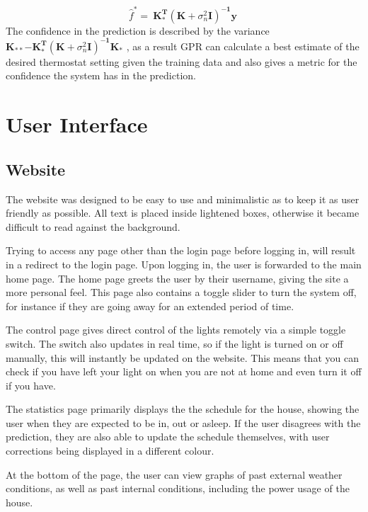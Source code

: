 \documentclass[10.5pt,a4paper,twoside]{report}   %
\begin{document}
\begin{equation}
{\hat{f}}^*=\ {\boldsymbol{K}}^{\boldsymbol{T}}_{\boldsymbol{*}}{\left(\boldsymbol{K}+{\sigma }^2_n\boldsymbol{I}\right)}^{\boldsymbol{-}\boldsymbol{1}}\boldsymbol{y}\ 
\end{equation}
The confidence in the prediction is described by the variance ${\boldsymbol{K}}_{\boldsymbol{\ast\ast}}\boldsymbol{-}{\boldsymbol{K}}^{\boldsymbol{T}}_{\boldsymbol{\ast}}{\left(\boldsymbol{K}+{\sigma }^2_n\boldsymbol{I}\right)}^{\boldsymbol{-}\boldsymbol{1}}{\boldsymbol{K}}_{\boldsymbol{\ast}}$ , as a result GPR can calculate a best estimate of the desired thermostat setting given the training data and also gives a metric for the confidence the system has in the prediction.     

\section{User Interface}
\subsection{Website}
The website was designed to be easy to use and minimalistic as to keep it as user friendly as possible. All text is placed inside lightened boxes, otherwise it became difficult to read against the background.

Trying to access any page other than the login page before logging in, will result in a redirect to the login page. Upon logging in, the user is forwarded to the main home page. The home page greets the user by their username, giving the site a more personal feel. This page also contains a toggle slider to turn the system off, for instance if they are going away for an extended period of time.

The control page gives direct control of the lights remotely via a simple toggle switch. The switch also updates in real time, so if the light is turned on or off manually, this will instantly be updated on the website. This means that you can check if you have left your light on when you are not at home and even turn it off if you have.

The statistics page primarily displays the the schedule for the house, showing the user when they are expected to be in, out or asleep. If the user disagrees with the prediction, they are also able to update the schedule themselves, with user corrections being displayed in a different colour.

At the bottom of the page, the user can view graphs of past external weather conditions, as well as past internal conditions, including the power usage of the house.
\end{document}
